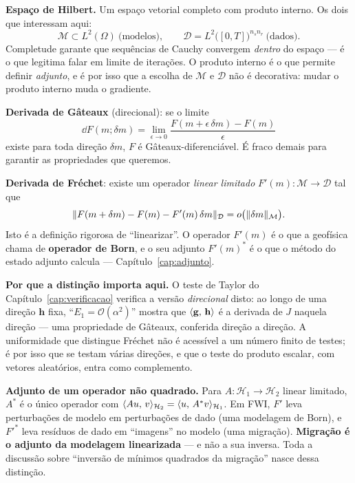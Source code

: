 \documentclass[11pt,a4paper,oneside]{report}
\begin{document}
\begin{matematica}
\textbf{Espa\c{c}o de Hilbert.} Um espa\c{c}o vetorial completo com produto
interno. Os dois que interessam aqui:
\[
\mathcal{M} \subset L^{2}(\Omega)
\ \text{(modelos)},
\qquad
\mathcal{D} = L^{2}\bigl([0,T]\bigr)^{n_s n_r}
\ \text{(dados)} .
\]
Completude garante que sequ\^encias de Cauchy convergem \emph{dentro} do
espa\c{c}o --- \'e o que legitima falar em limite de itera\c{c}\~oes. O produto
interno \'e o que permite definir \emph{adjunto}, e \'e por isso que a escolha
de $\mathcal{M}$ e $\mathcal{D}$ n\~ao \'e decorativa: mudar o produto interno
muda o gradiente.

\textbf{Derivada de G\^ateaux} (direcional): se o limite
\[
\dd F(m;\delta m) = \lim_{\epsilon\to 0}
\frac{F(m+\epsilon\,\delta m) - F(m)}{\epsilon}
\]
existe para toda dire\c{c}\~ao $\delta m$, $F$ \'e G\^ateaux-diferenci\'avel.
\'E fraco demais para garantir as propriedades que queremos.

\textbf{Derivada de Fr\'echet}: existe um operador \emph{linear limitado}
$F'(m):\mathcal{M}\to\mathcal{D}$ tal que
\begin{equation}
\lVert F(m+\delta m) - F(m) - F'(m)\,\delta m \rVert_{\mathcal{D}}
 = o\bigl(\lVert \delta m \rVert_{\mathcal{M}}\bigr).
\label{eq:frechet}
\end{equation}
Isto \'e a defini\c{c}\~ao rigorosa de ``linearizar''. O operador $F'(m)$ \'e o
que a geof\'isica chama de \textbf{operador de Born}, e o seu adjunto
$F'(m)^{*}$ \'e o que o m\'etodo do estado adjunto calcula ---
Cap\'itulo~\ref{cap:adjunto}.

\textbf{Por que a distin\c{c}\~ao importa aqui.} O teste de Taylor do
Cap\'itulo~\ref{cap:verificacao} verifica a vers\~ao \emph{direcional} disto:
ao longo de uma dire\c{c}\~ao $\mathbf{h}$ fixa, ``$E_1 = \mathcal{O}(\alpha^{2})$''
mostra que $\langle \mathbf{g},\,\mathbf{h}\rangle$ \'e a derivada de $J$ naquela
dire\c{c}\~ao --- uma propriedade de G\^ateaux, conferida dire\c{c}\~ao a
dire\c{c}\~ao. A uniformidade que distingue Fr\'echet n\~ao \'e acess\'ivel a
um n\'umero finito de testes; \'e por isso que se testam v\'arias dire\c{c}\~oes,
e que o teste do produto escalar, com vetores aleat\'orios, entra como
complemento.

\textbf{Adjunto de um operador n\~ao quadrado.} Para
$A:\mathcal{H}_1\to\mathcal{H}_2$ linear limitado, $A^{*}$ \'e o \'unico
operador com $\langle Au,\,v\rangle_{\mathcal{H}_2} = \langle u,\,A^{*}v\rangle_{\mathcal{H}_1}$.
Em FWI, $F'$ leva perturba\c{c}\~oes de modelo em perturba\c{c}\~oes de dado
(uma modelagem de Born), e $F'^{*}$ leva res\'iduos de dado em
``imagens'' no modelo (uma migra\c{c}\~ao). \textbf{Migra\c{c}\~ao \'e o
adjunto da modelagem linearizada} --- e n\~ao a sua inversa. Toda a
discuss\~ao sobre ``invers\~ao de m\'inimos quadrados da migra\c{c}\~ao''
nasce dessa distin\c{c}\~ao.
\end{matematica}
\end{document}
